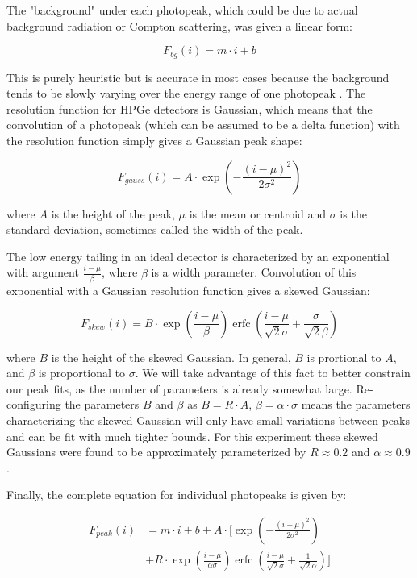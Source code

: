 \documentclass[aps,superscriptaddress,twocolumn,secnumarabic,balancelastpage,amsmath,amssymb,nofootinbib,floatfix]{revtex4-1}
\DeclareMathOperator\erfc{erfc}
\begin{document}
The "background" under each photopeak, which could be due to actual background radiation or Compton scattering, was given a linear form:

\begin{equation}
F_{bg}(i) = m\cdot i + b
\label{eq:background}
\end{equation}

This is purely heuristic but is accurate in most cases because the background tends to be slowly varying over the energy range of one photopeak \cite{gammas}.  The resolution function for HPGe detectors is Gaussian, which means that the convolution of a photopeak (which can be assumed to be a delta function) with the resolution function simply gives a Gaussian peak shape:

\begin{equation}
F_{gauss}(i) = A\cdot \exp (-\frac{(i-\mu)^2}{2\sigma^2})
\label{eq:gaussian}
\end{equation}

where $A$ is the height of the peak, $\mu$ is the mean or centroid and $\sigma$ is the standard deviation, sometimes called the width of the peak.

The low energy tailing in an ideal detector is characterized by an exponential with argument $\frac{i-\mu}{\beta}$, where $\beta$ is a width parameter.  Convolution of this exponential with a Gaussian resolution function gives a skewed Gaussian:

\begin{equation}
F_{skew}(i) = B\cdot \exp (\frac{i-\mu}{\beta}) \erfc (\frac{i-\mu}{\sqrt{2}\sigma}+\frac{\sigma}{\sqrt{2}\beta})
\label{eq:skew}
\end{equation}

where $B$ is the height of the skewed Gaussian.  In general, $B$ is prortional to $A$, and $\beta$ is proportional to $\sigma$.  We will take advantage of this fact to better constrain our peak fits, as the number of parameters is already somewhat large.  Re-configuring the parameters $B$ and $\beta$ as $B = R\cdot A$, $\beta = \alpha \cdot \sigma$ means the parameters characterizing the skewed Gaussian will only have small variations between peaks and can be fit with much tighter bounds.  For this experiment these skewed Gaussians were found to be approximately parameterized by $R \approx 0.2$ and $\alpha \approx 0.9$.

Finally, the complete equation for individual photopeaks is given by:

\begin{align*}
F_{peak}(i) &= m\cdot i + b + A\cdot [\exp (-\frac{(i-\mu)^2}{2\sigma^2}) \\
& + R\cdot \exp (\frac{i-\mu}{\alpha \sigma}) \erfc (\frac{i-\mu}{\sqrt{2}\sigma}+\frac{1}{\sqrt{2}\alpha})]
\label{eq:peak}
\end{align*}
\end{document}
